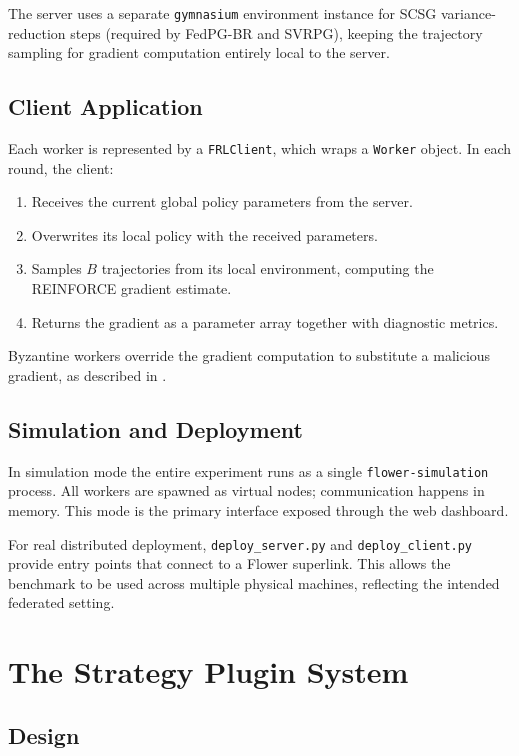 The server uses a separate \texttt{gymnasium} environment instance for SCSG
variance-reduction steps (required by FedPG-BR and SVRPG), keeping the
trajectory sampling for gradient computation entirely local to the server.

\subsection{Client Application}

Each worker is represented by a \texttt{FRLClient}, which wraps a \texttt{Worker}
object. In each round, the client:
\begin{enumerate}
    \item Receives the current global policy parameters from the server.
    \item Overwrites its local policy with the received parameters.
    \item Samples $B$ trajectories from its local environment, computing the
          REINFORCE gradient estimate.
    \item Returns the gradient as a parameter array together with diagnostic
          metrics.
\end{enumerate}

Byzantine workers override the gradient computation to substitute a malicious
gradient, as described in .

\subsection{Simulation and Deployment}

In simulation mode the entire experiment runs as a single \texttt{flower-simulation}
process. All workers are spawned as virtual nodes; communication happens in memory.
This mode is the primary interface exposed through the web dashboard.

For real distributed deployment, \texttt{deploy\_server.py} and
\texttt{deploy\_client.py} provide entry points that connect to a Flower
superlink. This allows the benchmark to be used across multiple physical machines,
reflecting the intended federated setting.

\section{The Strategy Plugin System}

\subsection{Design}

